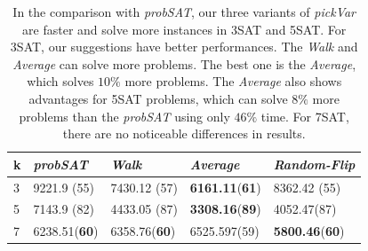\documentclass[12pt,a4paper,twoside]{scrartcl}
\numberwithin{equation}{section}
\begin{document}
\begin{table}[h!]
\begin{center}
    \begin{tabular}{|l|l|l|l|p{3cm}|}
\hline 
    k &\emph{probSAT}&\emph{Walk}&\emph{Average}&\emph{Random-Flip} \\ \hline
	3&9221.9 (55)&7430.12 (57)&\textbf{6161.11}(\textbf{61})&8362.42 (55) \\ \hline
	5&7143.9 (82)&4433.05 (87)&\textbf{3308.16}(\textbf{89})&4052.47(87)\\ \hline

	7& 	6238.51(\textbf{60})& 6358.76(\textbf{60})&6525.597(59)&\textbf{5800.46}(\textbf{60})\\ \hline
	
\end{tabular}
\caption{In the comparison with \emph{probSAT}, our three variants of \emph{pickVar} are faster and solve more instances in 3SAT and 5SAT. For 3SAT, our suggestions have better performances. The \emph{Walk} and \emph{Average} can solve more problems. The best one is the \emph{Average}, which solves $10\%$ more problems. The \emph{Average} also shows advantages for 5SAT problems, which can solve $8\%$ more problems than the \emph{probSAT} using only $46\%$ time. For 7SAT, there are no noticeable differences in results.}
\end{center}
\end{table} 
\clearpage
\end{document}
